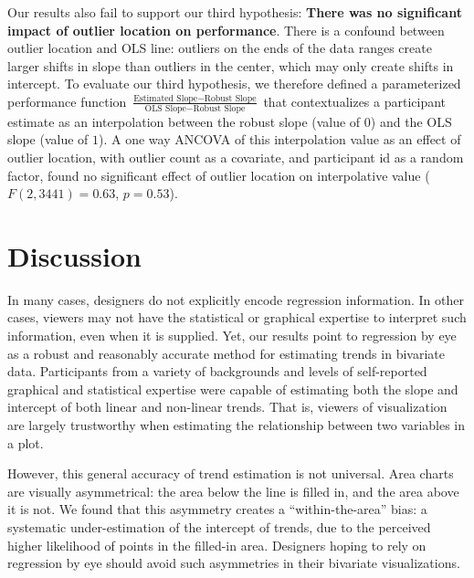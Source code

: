 \documentclass{sigchi}
\begin{document}
Our results also fail to support our third hypothesis: \textbf{There was no significant impact of outlier location on performance}. There is a confound between outlier location and OLS line: outliers on the ends of the data ranges create larger shifts in slope than outliers in the center, which may only create shifts in intercept. To evaluate our third hypothesis, we therefore defined a parameterized performance function $\frac{\text{Estimated Slope}-\text{Robust Slope}}{\text{OLS Slope} - \text{Robust Slope}}$ that contextualizes a participant estimate as an interpolation between the robust slope (value of $0$) and the OLS slope (value of $1$). A one way ANCOVA of this interpolation value as an effect of outlier location, with outlier count as a covariate, and participant id as a random factor, found no significant effect of outlier location on interpolative value ($F(2,3441)=0.63$, $p=0.53$).


\section{Discussion}

In many cases, designers do not explicitly encode regression information. In other cases, viewers may not have the statistical or graphical expertise to interpret such information, even when it is supplied. Yet, our results point to regression by eye as a robust and reasonably accurate method for estimating trends in bivariate data. Participants from a variety of backgrounds and levels of self-reported graphical and statistical expertise were capable of estimating both the slope and intercept of both linear and non-linear trends. That is, viewers of visualization are largely trustworthy when estimating the relationship between two variables in a plot.

However, this general accuracy of trend estimation is not universal. Area charts are visually asymmetrical: the area below the line is filled in, and the area above it is not. We found that this asymmetry creates a ``within-the-area'' bias: a systematic under-estimation of the intercept of trends, due to the perceived higher likelihood of points in the filled-in area. Designers hoping to rely on regression by eye should avoid such asymmetries in their bivariate visualizations.
\end{document}
